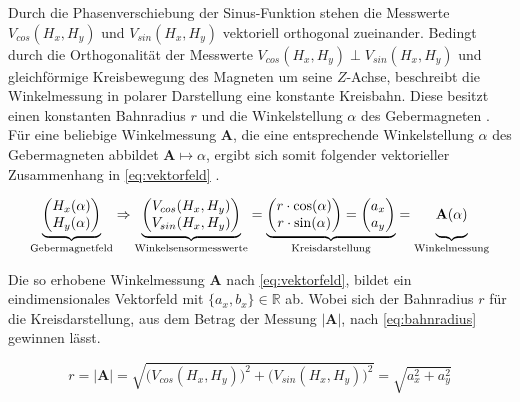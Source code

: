 Durch die Phasenverschiebung der Sinus-Funktion stehen die Messwerte $V_{cos}(H_x,H_y)$ und $V_{sin}(H_x,H_y)$ 
vektoriell orthogonal zueinander. Bedingt durch die Orthogonalität der Messwerte $V_{cos}(H_x,H_y) \perp 
V_{sin}(H_x,H_y)$ und gleichförmige Kreisbewegung des Magneten um seine $Z$-Achse, beschreibt die Winkelmessung in 
polarer Darstellung eine konstante Kreisbahn. Diese besitzt einen konstanten Bahnradius $r$ und die Winkelstellung 
$\alpha$ des Gebermagneten \cite{Schuethe2019}.
\newline
Für eine beliebige Winkelmessung $\mathbf{A}$, die eine entsprechende Winkelstellung $\alpha$ des Gebermagneten 
abbildet $\mathbf{A}\mapsto\alpha$, ergibt sich somit folgender vektorieller Zusammenhang in \autoref{eq:vektorfeld} 
\cite{Schuethe2020}.


\begin{equation}\label{eq:vektorfeld}
\underbrace{\begin{pmatrix} H_x(\alpha) \\ H_y(\alpha) \end{pmatrix}}_{\textrm{Gebermagnetfeld}}\Rightarrow
\underbrace{
	\begin{pmatrix} V_{cos}(H_x,H_y) \\ V_{sin}(H_x,H_y) \end{pmatrix}}_{\textrm{Winkelsensormesswerte}}=
\underbrace{
	\begin{pmatrix} r\cdot\cos(\alpha) \\ r\cdot\sin(\alpha)\end{pmatrix}=
	\begin{pmatrix} a_x \\ a_y \end{pmatrix}}_{\textrm{Kreisdarstellung}}=
\underbrace{\mathbf{A}(\alpha) \vphantom{\begin{pmatrix}x\\y\end{pmatrix}}}_{\textrm{Winkelmessung}}
\end{equation}

Die so erhobene Winkelmessung $\mathbf{A}$ nach \autoref{eq:vektorfeld}, bildet ein eindimensionales Vektorfeld mit 
$\{a_x,b_x\}\in\mathbb{R}$ ab. Wobei sich der Bahnradius $r$ für die Kreisdarstellung, aus dem Betrag der Messung 
$|\mathbf{A}|$, nach \autoref{eq:bahnradius} gewinnen lässt.


\begin{equation}\label{eq:bahnradius}
r = |\mathbf{A}| = \sqrt{\big(V_{cos}(H_x,H_y)\big)^2 + \big(V_{sin}(H_x,H_y)\big)^2} =\sqrt{a_x^2 + a_y^2}
\end{equation}


